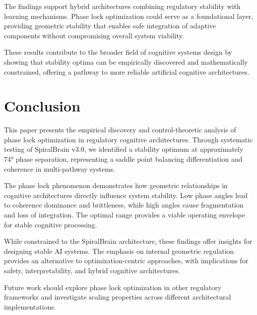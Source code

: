 \documentclass[12pt,a4paper]{report}
\begin{document}
The findings support hybrid architectures combining regulatory stability with learning mechanisms. Phase lock optimization could serve as a foundational layer, providing geometric stability that enables safe integration of adaptive components without compromising overall system viability.

These results contribute to the broader field of cognitive systems design by showing that stability optima can be empirically discovered and mathematically constrained, offering a pathway to more reliable artificial cognitive architectures.

\section{Conclusion}

This paper presents the empirical discovery and control-theoretic analysis of phase lock optimization in regulatory cognitive architectures. Through systematic testing of SpiralBrain v3.0, we identified a stability optimum at approximately 74° phase separation, representing a saddle point balancing differentiation and coherence in multi-pathway systems.

The phase lock phenomenon demonstrates how geometric relationships in cognitive architectures directly influence system stability. Low phase angles lead to coherence dominance and brittleness, while high angles cause fragmentation and loss of integration. The optimal range provides a viable operating envelope for stable cognitive processing.

While constrained to the SpiralBrain architecture, these findings offer insights for designing stable AI systems. The emphasis on internal geometric regulation provides an alternative to optimization-centric approaches, with implications for safety, interpretability, and hybrid cognitive architectures.

Future work should explore phase lock optimization in other regulatory frameworks and investigate scaling properties across different architectural implementations.



\end{document}
